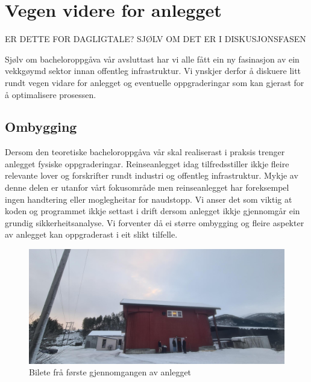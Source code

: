 \section{Vegen videre for anlegget}
\thispagestyle{fancy}

ER DETTE FOR DAGLIGTALE? SJØLV OM DET ER I DISKUSJONSFASEN

Sjølv om bacheloroppgåva vår avsluttast har vi alle fått ein ny fasinasjon av ein vekkgøymd sektor innan offentleg infrastruktur. 
Vi ynskjer derfor å diskuere litt rundt vegen vidare for anlegget og eventuelle oppgraderingar som kan gjerast
for å optimalisere prosessen.

\subsection{Ombygging}

Dersom den teoretiske bacheloroppgåva vår skal realiserast i praksis trenger anlegget fysiske oppgraderingar.
Reinseanlegget idag tilfredsstiller ikkje fleire relevante lover og forskrifter rundt industri og offentleg infrastruktur.
Mykje av denne delen er utanfor vårt fokusområde men reinseanlegget har foreksempel ingen handtering eller moglegheitar for naudstopp.
Vi anser det som viktig at koden og programmet ikkje settast i drift dersom anlegget ikkje gjennomgår ein grundig sikkerheitsanalyse.
Vi forventer då ei større ombygging og fleire aspekter av anlegget kan oppgraderast i eit slikt tilfelle. \newline \newline

\begin{figure}[htbp]
    \centering
    \includegraphics[width=1\textwidth]{Bilder/SandeGjennomgang.jpg}
    \caption{Bilete frå første gjennomgangen av anlegget}\label{fig:Bilete Gjennomgang}
\end{figure}

\newpage

